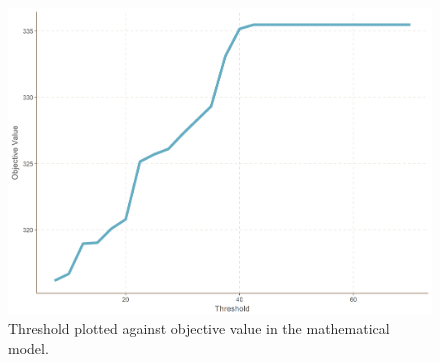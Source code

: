  
\begin{figure}[H]
    \centering
    \includegraphics[scale=0.5]{fig/chapter_7/GW1_var.png}
    \caption{Threshold plotted against objective value in the mathematical model.}
\label{fig:threshold_GW1}    
\end{figure}%


